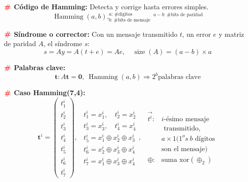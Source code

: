 \documentclass[%
 reprint,
 amsmath,amssymb,
 aps,
]{revtex4-1}
\begin{document}
\textbf{$\color{red}{\textbf{\#}}$ Código de Hamming:} Detecta y corrige hasta errores simples.
$$
\operatorname{Hamming}(a, b), 
^{a\text{: \# dígitos}}_{b\text{: \# bits de mensaje}}
\
^{a-b\text{: \# bits de paridad}}
$$

\textbf{$\color{red}{\textbf{\#}}$ Síndrome o corrector:} Con un mensaje transmitido $t$, un error $e$ y matriz de paridad $A$, el síndrome $s$:
$$
s=A y=A(t+e)=A e,\quad \operatorname{size}(A) = (a-b) \times a
$$

\textbf{$\color{red}{\textbf{\#}}$ Palabras clave:} 
$$\mathbf{t}:A\mathbf{t}=\mathbf{0},\ \operatorname{Hamming}(a,b) \Rightarrow 2^b \text{palabras clave}$$

\textbf{$\color{red}{\textbf{\#}}$ Caso Hamming(7,4):}
$$
\boldsymbol{t}^{i}=\left(\begin{array}{c}
  t_{1}^{i} \\
  t_{2}^{i} \\
  t_{3}^{i} \\
  t_{4}^{i} \\
  t_{5}^{i} \\
  t_{6}^{i} \\
  t_{7}^{i}
\end{array}\right), \ \
\begin{aligned}
  t_{1}^{i}=x_{1}^{i},\quad t_{2}^{i}=x_{2}^{i} \\
  t_{3}^{i}=x_{3}^{i},\quad t_{4}^{i}=x_{4}^{i} \\
  t_{5}^{i}=x_{1}^{i} \oplus x_{2}^{i} \oplus x_{3}^{i} \\
  t_{6}^{i}=x_{2}^{i} \oplus x_{3}^{i} \oplus x_{4}^{i} \\
  t_{7}^{i}=x_{1}^{i} \oplus x_{3}^{i} \oplus x_{4}^{i}
\end{aligned}, \ \
\begin{aligned}
  \vec{t^i}: & i\text{-ésimo mensaje} \\
  &\text{ transmitido},\\
  &a \times 1 (1^os \ b \text{ dígitos}\\
  & \text{son el mensaje})\\
  \oplus: & \text{suma xor} (\oplus_2)
\end{aligned}
$$
\end{document}

